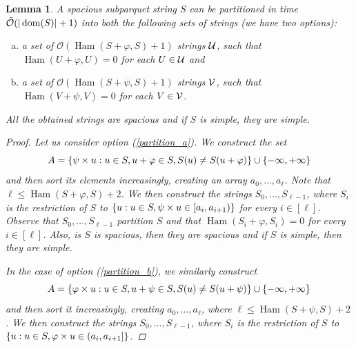 \documentclass[11pt]{article}
\renewcommand{\O}{\mathcal{O}}
\newcommand{\tO}{\tilde{\mathcal{O}}}
\renewcommand{\phi}{\varphi}
\newcommand{\set}[1]{\left\lbrace #1 \right\rbrace}
\theoremstyle{plain}
\newtheorem{lemma}{Lemma}
\theoremstyle{definition}
\theoremstyle{remark}
\DeclareMathOperator*{\Ham}{Ham}
\begin{document}
\begin{lemma}\label{cut_partitioning}
	A spacious subparquet string $S$ can be partitioned in time $\tO(|\d{S}| + 1)$ into both the following sets of strings (we have two options):
	\begin{enumerate}[a)]
		\item a set of $\O(\Ham(S + \phi, S) + 1)$ strings $\mathcal{U}$, such that $\Ham(U + \phi, U) = 0$ for each $U \in \mathcal{U}$ and \label{partition_a}
		\item a set of $\O(\Ham(S + \psi, S) + 1)$ strings $\mathcal{V}$, such that $\Ham(V + \psi, V) = 0$ for each $V \in \mathcal{V}$. \label{partition_b}
	\end{enumerate}
	All the obtained strings are spacious and if $S$ is simple, they are simple.
	\begin{proof}
		Let us consider option (\ref{partition_a}). We construct the set
		\[ A = \set{\s{u} : u \in S, u + \phi \in S, S(u) \neq S(u + \phi)} \cup \set{-\infty, +\infty}\]
		and then sort its elements increasingly, creating an array $a_0, \dots, a_\ell$.
		Note that $\ell \le \Ham(S + \phi, S) + 2$.
		We then construct the strings $S_0, \dots, S_{\ell - 1}$, where $S_i$ is the restriction of $S$ to
		$\set{u : u \in S, \s{u} \in [a_i, a_{i + 1})}$ for every $i \in [\ell]$.
		Observe that $S_0, \dots, S_{\ell - 1}$ partition $S$ and that $\Ham(S_i + \phi, S_i) = 0$ for every $i \in [\ell]$.
		Also, is $S$ is spacious, then they are spacious and if $S$ is simple, then they are simple.
	
		In the case of option (\ref{partition_b}), we similarly construct
		\[ A = \set{\h{u} : u \in S, u + \psi \in S, S(u) \neq S(u + \psi)} \cup \set{-\infty, +\infty} \]
		and then sort it increasingly, creating $a_0, \dots, a_\ell$, where $\ell \le \Ham(S + \psi, S) + 2$.
		We then construct the strings $S_0, \dots, S_{\ell - 1}$, where $S_i$ is the restriction of $S$ to 
		$\set{u : u \in S, \h{u} \in (a_i, a_{i + 1}]}$.
	\end{proof}
\end{lemma}
\end{document}
